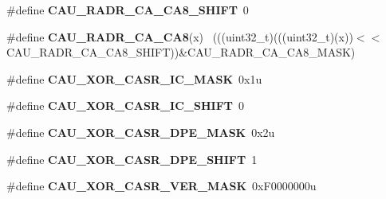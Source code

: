 \begin{DoxyCompactItemize}
\item 
\hypertarget{group___c_a_u___register___masks_ga5dde041188525dacccc86994f3b4a62c}{}\#define {\bfseries C\+A\+U\+\_\+\+R\+A\+D\+R\+\_\+\+C\+A\+\_\+\+C\+A8\+\_\+\+S\+H\+I\+F\+T}~0\label{group___c_a_u___register___masks_ga5dde041188525dacccc86994f3b4a62c}

\item 
\hypertarget{group___c_a_u___register___masks_ga28cd8108c618b567cf72011c86dcf18c}{}\#define {\bfseries C\+A\+U\+\_\+\+R\+A\+D\+R\+\_\+\+C\+A\+\_\+\+C\+A8}(x)                                          ~(((uint32\+\_\+t)(((uint32\+\_\+t)(x))$<$$<$C\+A\+U\+\_\+\+R\+A\+D\+R\+\_\+\+C\+A\+\_\+\+C\+A8\+\_\+\+S\+H\+I\+F\+T))\&C\+A\+U\+\_\+\+R\+A\+D\+R\+\_\+\+C\+A\+\_\+\+C\+A8\+\_\+\+M\+A\+S\+K)\label{group___c_a_u___register___masks_ga28cd8108c618b567cf72011c86dcf18c}

\item 
\hypertarget{group___c_a_u___register___masks_gaca3c61b76adc9812ea3851c4b704c43f}{}\#define {\bfseries C\+A\+U\+\_\+\+X\+O\+R\+\_\+\+C\+A\+S\+R\+\_\+\+I\+C\+\_\+\+M\+A\+S\+K}~0x1u\label{group___c_a_u___register___masks_gaca3c61b76adc9812ea3851c4b704c43f}

\item 
\hypertarget{group___c_a_u___register___masks_ga371852a2013f6f7d79b8fcd434367358}{}\#define {\bfseries C\+A\+U\+\_\+\+X\+O\+R\+\_\+\+C\+A\+S\+R\+\_\+\+I\+C\+\_\+\+S\+H\+I\+F\+T}~0\label{group___c_a_u___register___masks_ga371852a2013f6f7d79b8fcd434367358}

\item 
\hypertarget{group___c_a_u___register___masks_ga71d1db03ca6c06a051297201f2e8d855}{}\#define {\bfseries C\+A\+U\+\_\+\+X\+O\+R\+\_\+\+C\+A\+S\+R\+\_\+\+D\+P\+E\+\_\+\+M\+A\+S\+K}~0x2u\label{group___c_a_u___register___masks_ga71d1db03ca6c06a051297201f2e8d855}

\item 
\hypertarget{group___c_a_u___register___masks_ga2c2901b4531d55d9625468c78cea25b0}{}\#define {\bfseries C\+A\+U\+\_\+\+X\+O\+R\+\_\+\+C\+A\+S\+R\+\_\+\+D\+P\+E\+\_\+\+S\+H\+I\+F\+T}~1\label{group___c_a_u___register___masks_ga2c2901b4531d55d9625468c78cea25b0}

\item 
\hypertarget{group___c_a_u___register___masks_ga1ac156673986e2dc85b9d9491a3d4bf2}{}\#define {\bfseries C\+A\+U\+\_\+\+X\+O\+R\+\_\+\+C\+A\+S\+R\+\_\+\+V\+E\+R\+\_\+\+M\+A\+S\+K}~0x\+F0000000u\label{group___c_a_u___register___masks_ga1ac156673986e2dc85b9d9491a3d4bf2}


\end{DoxyCompactItemize}
